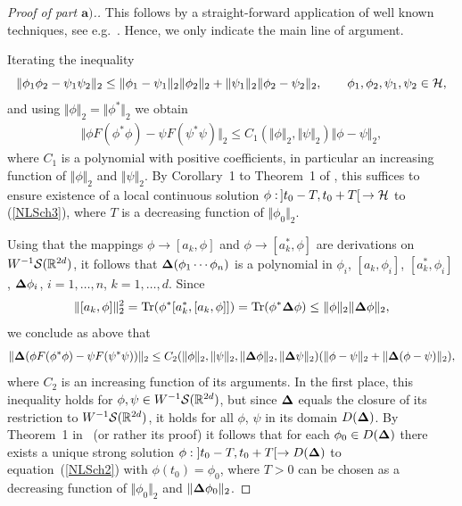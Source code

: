 \documentclass[10pt,a4paper]{amsart}
\begin{document}
\begin{proof}[Proof of part $\boldsymbol{a)}$.]  This follows by a straight-forward
application of well known techniques, see e.g.~\cite{Reed}. Hence, we
only indicate the main line of argument.

Iterating the inequality
\[
\Vert \phi_1\phi_2- \psi_1\psi_2\Vert_2 \leq
\Vert\phi_1-\psi_1\Vert_2\Vert\phi_2\Vert_2+\Vert\psi_1\Vert_2\Vert\phi_2-\psi_2\Vert_2,\qquad
 \phi_1, \phi_2, \psi_1, \psi_2\in{\cal H},
\]
and using $\Vert\phi\Vert _2=\Vert \phi^*\Vert_2$ we obtain
\begin{gather}\label{H1}
\Vert\phi F(\phi^*\phi)-\psi F(\psi^*\psi)\Vert_2 \leq C_1(
\Vert\phi\Vert_2,\Vert\psi\Vert_2)\Vert\phi-\psi\Vert_2  ,
\end{gather}
where $C_1$ is a polynomial with positive coef\/f\/icients, in particular an
increasing function of $\Vert\phi\Vert_2$ and $\Vert\psi\Vert_2$.
By Corollary~1 to Theorem~1 of \cite{Reed}, this suf\/f\/ices to ensure existence of a
local continuous solution $\phi: \,]t_0-T,t_0+T[\, \to {\cal H}$ to (\ref{NLSch3}), where $T$
is a decreasing function of $\Vert\phi_0\Vert_2$.

Using that the mappings $\phi\to [a_k,\phi]$ and  $\phi\to
[a^*_k,\phi]$ are derivations on $W^{-1}{\cal S}(\mathbb R^{2d})$, it
follows that ${{\bf\Delta}}(\phi_1\cdots\phi_n)$ is a polynomial in
$\phi_i$, $[a_k,\phi_i]$, $[a_k^*,\phi_i]$,
${\bf\Delta}\phi_i$, $i=1,\dots,n$, $k=1,\dots,d$. Since
\begin{gather}\label{est1}
\Vert[a_k,\phi]\Vert^2_2 =
\mbox{Tr}(\phi^*[a_k^*,[a_k,\phi]])=
\mbox{Tr}(\phi^*{{\bf\Delta}}\phi)\leq \Vert\phi\Vert_2\Vert{{\bf\Delta}}\phi\Vert_2 ,
\end{gather}
we conclude as above that
\begin{gather*}%
\Vert {\bf\Delta}(\phi F(\phi^*\phi)-\psi F(\psi^*\psi))\Vert_2 \leq
C_2(\Vert\phi\Vert_2,\Vert\psi\Vert_2,\Vert{\bf\Delta}\phi\Vert_2,\Vert{\bf\Delta}\psi\Vert_2)(\Vert\phi-\psi\Vert_2
+ \Vert{\bf\Delta}(\phi-\psi)\Vert_2),
\end{gather*}
where $C_2$ is an increasing function of its arguments. In the f\/irst
place, this inequality holds for $\phi,\psi\in W^{-1}{\cal S}(\mathbb
R^{2d})$, but since ${\bf\Delta}$ equals the closure of its restriction to $W^{-1}{\cal S}(\mathbb R^{2d})$,
it holds for all $\phi$, $\psi$ in its domain $D({\bf\Delta})$. By Theorem~1 in~\cite{Reed} (or rather its proof) it follows that for each $\phi_0\in
D({\bf\Delta})$ there exists a unique strong solution
$\phi: \; ]t_0-T,t_0+T[\to D({\bf\Delta})$ to equation~(\ref{NLSch2}) with $\phi(t_0)=\phi_0$, where $T>0$ can be
chosen as a decreasing function of $\Vert\phi_0\Vert_2$ and
$\Vert{\bf\Delta}\phi_0\Vert_2$.


\end{proof}
\end{document}
